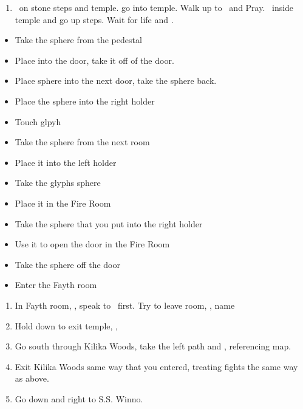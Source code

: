 \begin{enumerate}[resume]
	\item \sd\ on stone steps and temple. go into temple. Walk up to \wakka\ and Pray. \sd\ inside temple and go up steps. Wait for life and \sd.
\end{enumerate}
\begin{trial}
	\begin{itemize}
		\item Take the sphere from the pedestal
		\item Place into the door, take it off of the door.
		\item Place sphere into the next door, take the sphere back.
		\item Place the sphere into the right holder
		\item Touch glpyh
		\item Take the sphere from the next room
		\item Place it into the left holder
		\item Take the glyphs sphere
		\item Place it in the Fire Room
		\item Take the sphere that you put into the right holder
		\item Use it to open the door in the Fire Room
		\item Take the sphere off the door
		\item Enter the Fayth room
	\end{itemize}
\end{trial}
\begin{enumerate}[resume]
	\item In Fayth room, \sd, speak to \wakka\ first. Try to leave room, \sd, name \ifrit
	\item Hold down to exit temple, \cs[0:40], \sd
	\item Go south through Kilika Woods, take the left path and , referencing map.
	\item Exit Kilika Woods same way that you entered, treating fights the same way as above.
	\item Go down and right to S.S. Winno. \sd
\end{enumerate}
	